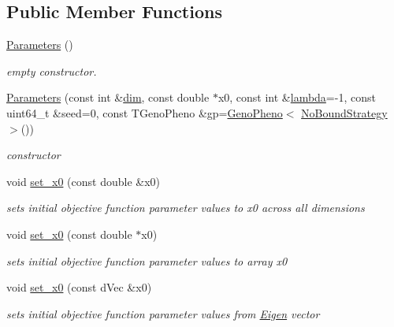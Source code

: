 \subsection*{Public Member Functions}
\begin{DoxyCompactItemize}
\item 
\hypertarget{classlibcmaes_1_1Parameters_a680f96c102aa0cb4c9e8d39b515392b9}{\hyperlink{classlibcmaes_1_1Parameters_a680f96c102aa0cb4c9e8d39b515392b9}{Parameters} ()}\label{classlibcmaes_1_1Parameters_a680f96c102aa0cb4c9e8d39b515392b9}

\begin{DoxyCompactList}\small\item\em empty constructor. \end{DoxyCompactList}\item 
\hyperlink{classlibcmaes_1_1Parameters_a082cedda8396793496e8d796bc0184b2}{Parameters} (const int \&\hyperlink{classlibcmaes_1_1Parameters_a95a3c04400a77d134bb1e9705189a24e}{dim}, const double $\ast$x0, const int \&\hyperlink{classlibcmaes_1_1Parameters_a3d569987e9a5eb61bc781ee75b2ab18a}{lambda}=-\/1, const uint64\-\_\-t \&seed=0, const T\-Geno\-Pheno \&gp=\hyperlink{classlibcmaes_1_1GenoPheno}{Geno\-Pheno}$<$ \hyperlink{classlibcmaes_1_1NoBoundStrategy}{No\-Bound\-Strategy} $>$())
\begin{DoxyCompactList}\small\item\em constructor \end{DoxyCompactList}\item 
void \hyperlink{classlibcmaes_1_1Parameters_a61660152146a78000b5cc59a0298a8f0}{set\-\_\-x0} (const double \&x0)
\begin{DoxyCompactList}\small\item\em sets initial objective function parameter values to x0 across all dimensions \end{DoxyCompactList}\item 
void \hyperlink{classlibcmaes_1_1Parameters_a50056ec90bc1b89295f8363eb566b8ce}{set\-\_\-x0} (const double $\ast$x0)
\begin{DoxyCompactList}\small\item\em sets initial objective function parameter values to array x0 \end{DoxyCompactList}\item 
void \hyperlink{classlibcmaes_1_1Parameters_a77985cc81f856083a63d85ebc11db0ae}{set\-\_\-x0} (const d\-Vec \&x0)
\begin{DoxyCompactList}\small\item\em sets initial objective function parameter values from \hyperlink{namespaceEigen}{Eigen} vector \end{DoxyCompactList}\item 

\end{DoxyCompactItemize}
